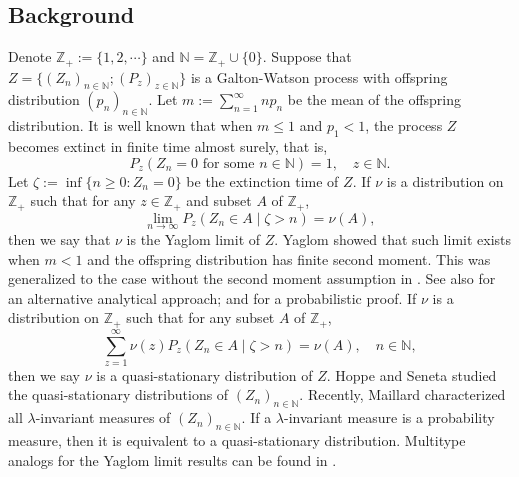 \documentclass[12pt,a4paper]{amsart}
\numberwithin{equation}{section}
\theoremstyle{plain}
\theoremstyle{definition}
\theoremstyle{remark}
\begin{document}
\subsection{Background}\label{sec:BGD}
	Denote $\mathbb Z_+:= \{1,2,\cdots\}$ and $\mathbb N = \mathbb Z_+ \cup \{0\}$.
	Suppose that $Z=\{(Z_n)_{n\in \mathbb N}; (P_z)_{z\in \mathbb N}\}$
	is a Galton-Watson process with offspring distribution
		$(p_n)_{n\in \mathbb N}$.
	Let $m:=\sum^{\infty}_{n=1}np_n$ be the mean
	of the offspring distribution.
	 It is well known that when $m \leq 1$ and $p_1<1$,
	the process $Z$ becomes extinct in finite time almost surely, that is,
\[
	P_z(Z_n = 0 \text{ for some $n \in \mathbb N$} ) = 1, \quad z \in \mathbb N.
\]
	Let $\zeta:=\inf\{n\geq 0: Z_n=0\}$ be the extinction time of $Z$.
	If $\nu$ is a distribution on
	$\mathbb Z_+$ such that for any $z\in \mathbb Z_+$ and subset $A$ of $\mathbb Z_+$,
\[
	\lim_{n\rightarrow\infty} P_z\left(Z_n\in A\middle|\zeta>n \right)=\nu(A),
\]
	then we say that $\nu$ is the Yaglom limit of $Z$.
	Yaglom \cite{Yaglom47} showed that such limit exists when $m < 1$ and the offspring distribution has finite second moment.
	This was generalized to the case without the second moment assumption
	in \cite{Heathcote, Joffe1967On}.
	See also \cite[pp. 64--65]{AthreyaNey1972Branching} for an alternative analytical approach; and \cite{LyonsPemantlePeres1995Conceptual} for a probabilistic proof.
	If $\nu$ is a distribution on $\mathbb Z_+$ such that for any subset $A$ of $\mathbb Z_+$,
\[
	\sum_{z = 1}^\infty \nu(z) P_z\left(Z_n\in A\middle|\zeta>n \right)
	=\nu(A), \quad n \in \mathbb N,
\]
	then we say $\nu$ is a quasi-stationary distribution of $Z$.
	Hoppe and Seneta \cite{HoppeSeneta1978Analytical} studied the quasi-stationary distributions of $(Z_n)_{n\in \mathbb N}$.
	Recently, Maillard \cite{Maillard2018The} characterized all  $\lambda$-invariant measures of $(Z_n)_{n \in \mathbb N}$.
	If a $\lambda$-invariant measure is a probability measure, then it is equivalent to a quasi-stationary distribution.
	Multitype analogs for the Yaglom limit results can be found in
	\cite{Hoppe1975Stationary, HoppeSeneta1978Analytical, JoffeSpitzer1967On}.
\end{document}
